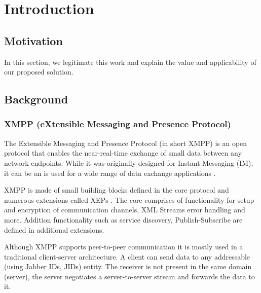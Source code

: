 \chapter{Introduction}
\label{sec:introduction}

\section{Motivation}
In this section, we legitimate this work and explain the value and applicability of our proposed solution.

\section{Background}


\subsection{XMPP (eXtensible Messaging and Presence Protocol)}
The Extensible Messaging and Presence Protocol (in short XMPP) is an open protocol that enables the near-real-time exchange of small data between any network endpoints\cite{rfc6120}. While it was originally designed for Instant Messaging (IM), it can be an is used for a wide range of data exchange applications \cite{ieee-xplore-stream-xml-xmpp}.


XMPP is made of small building blocks defined in the core protocol\cite{rfc6120} and numerous extensions called XEPs \cite{xep-0001}. The core comprises of functionality for setup and encryption of communication channels, XML Streams error handling and more. Addition functionality such as service discovery\cite{xep-0030}, Publish-Subscribe\cite{xep-0060} are defined in additional extensions.

Although XMPP supports peer-to-peer communication it is mostly used in a traditional client-server architecture. A client can send data to any addressable (using Jabber IDs, JIDs) entity. The receiver is not present in the same domain (server), the server negotiates a server-to-server stream and forwards the data to it.\cite{rfc6120}

